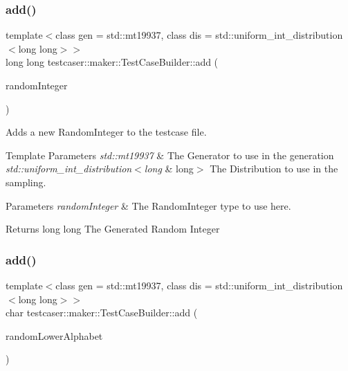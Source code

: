 \subsubsection{\texorpdfstring{add()}{add()}\hspace{0.1cm}{\footnotesize\ttfamily [4/11]}}
{\footnotesize\ttfamily template$<$class gen  = std\+::mt19937, class dis  = std\+::uniform\+\_\+int\+\_\+distribution$<$long long$>$$>$ \\
long long testcaser\+::maker\+::\+Test\+Case\+Builder\+::add (\begin{DoxyParamCaption}\item[{\mbox{\hyperlink{classtestcaser_1_1maker_1_1types_1_1RandomInteger}{types\+::\+Random\+Integer}}$<$ gen, dis $>$ \&}]{random\+Integer }\end{DoxyParamCaption})\hspace{0.3cm}{\ttfamily [inline]}}



Adds a new Random\+Integer to the testcase file. 


\begin{DoxyTemplParams}{Template Parameters}
{\em std\+::mt19937} & The Generator to use in the generation \\
\hline
{\em std\+::uniform\+\_\+int\+\_\+distribution$<$long} & long$>$ The Distribution to use in the sampling. \\
\hline
\end{DoxyTemplParams}

\begin{DoxyParams}{Parameters}
{\em random\+Integer} & The Random\+Integer type to use here. \\
\hline
\end{DoxyParams}
\begin{DoxyReturn}{Returns}
long long The Generated Random Integer 
\end{DoxyReturn}
\mbox{\label{classtestcaser_1_1maker_1_1TestCaseBuilder_a0666074618ac122218a4206b5952ca07}} 
\subsubsection{\texorpdfstring{add()}{add()}\hspace{0.1cm}{\footnotesize\ttfamily [5/11]}}
{\footnotesize\ttfamily template$<$class gen  = std\+::mt19937, class dis  = std\+::uniform\+\_\+int\+\_\+distribution$<$long long$>$$>$ \\
char testcaser\+::maker\+::\+Test\+Case\+Builder\+::add (\begin{DoxyParamCaption}\item[{\mbox{\hyperlink{classtestcaser_1_1maker_1_1types_1_1RandomLowerAlphabet}{types\+::\+Random\+Lower\+Alphabet}}$<$ gen, dis $>$ \&}]{random\+Lower\+Alphabet }\end{DoxyParamCaption})\hspace{0.3cm}{\ttfamily [inline]}}



